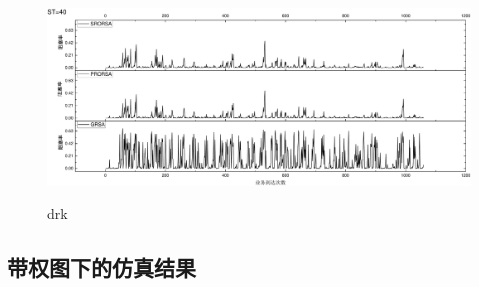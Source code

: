 \begin{figure}
\setlength{\belowcaptionskip}{-0.5cm}
  \begin{center}
    {\includegraphics[width=1 \textwidth]{figures/B40Z.pdf}}
    \end{center}
  \caption{{\footnotesize{drk}}}
  \label{drk}
\end{figure}
\subsection{带权图下的仿真结果}
